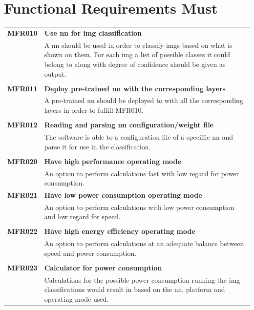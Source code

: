 \documentclass[parskip=full]{scrartcl}
\begin{document}
\section{Functional Requirements Must}
\begin{tabular}{p{2cm}p{12cm}}
\textbf{MFR010} & \textbf{Use \gls{nn} for \gls{img} classification}\\                                     
& A \gls{nn} should be used in order to classify \glspl{img} based on what is shown on them. For each \gls{img} a list of possible classes it could belong to along with degree of confidence should be given as output.\\
& \\
\textbf{MFR011} & \textbf{Deploy pre-trained \gls{nn} with the corresponding layers}\\
& A pre-trained \gls{nn} should be deployed to with all the corresponding layers in order to fulfill MFR010.\\
& \\
\textbf{MFR012} & \textbf{Reading and parsing \gls{nn} configuration/weight file}\\
& The software is able to a configuration file of a speciffic \gls{nn} and parse it for use in the classification.\\
& \\
\textbf{MFR020} & \textbf{Have high performance operating mode}\\                                     
& An option to perform calculations fast with low regard for power consumption.\\
\textbf{MFR021} & \textbf{Have low power consumption operating mode}\\                                     
& An option to perform calculations with low power consumption and low regard for speed.\\
& \\
\textbf{MFR022} & \textbf{Have high energy efficiency operating mode}\\                                     
& An option to perform calculations at an adequate balance between speed and power consumption.\\
& \\
\textbf{MFR023} & \textbf{Calculator for power consumption}\\                                     
& Calculations for the possible power consumption running the \gls{img} classifications would result in based on the \gls{nn}, platform and operating mode used.\\

\end{tabular}
\end{document}
